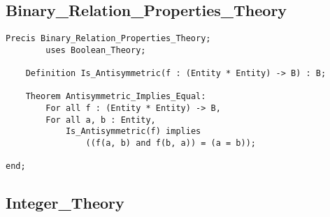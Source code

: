 	\subsection{Binary\_Relation\_Properties\_Theory}	%

\begin{lstlisting}[language=resolve]
Precis Binary_Relation_Properties_Theory;
		uses Boolean_Theory;

	Definition Is_Antisymmetric(f : (Entity * Entity) -> B) : B;

	Theorem Antisymmetric_Implies_Equal:
		For all f : (Entity * Entity) -> B,
		For all a, b : Entity,
			Is_Antisymmetric(f) implies 
				((f(a, b) and f(b, a)) = (a = b));

end;

\end{lstlisting}

	\subsection{Integer\_Theory}	%

